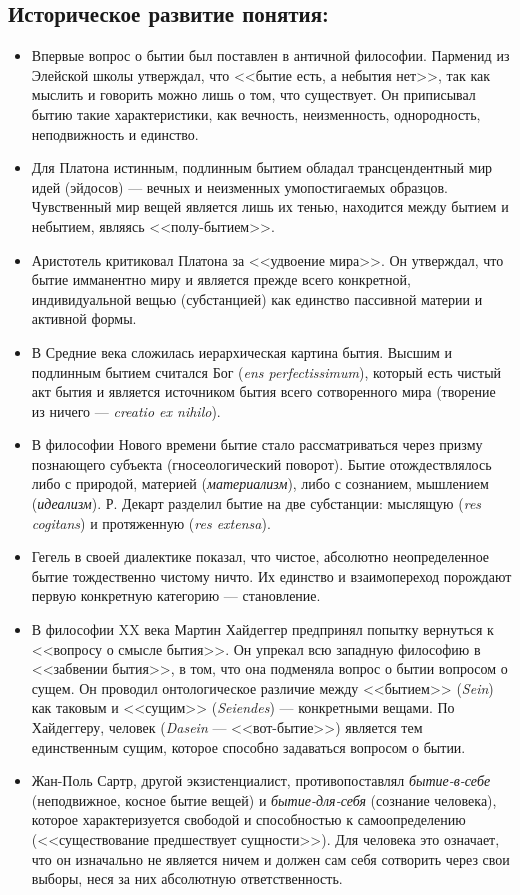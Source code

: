 \documentclass[12pt,a4paper]{article}
\begin{document}
	\subsection{Историческое развитие понятия:}
	\begin{itemize}
		\item Впервые вопрос о бытии был поставлен в античной философии. Парменид из Элейской школы утверждал, что <<бытие есть, а небытия нет>>, так как мыслить и говорить можно лишь о том, что существует. Он приписывал бытию такие характеристики, как вечность, неизменность, однородность, неподвижность и единство.
		\item Для Платона истинным, подлинным бытием обладал трансцендентный мир идей (эйдосов) — вечных и неизменных умопостигаемых образцов. Чувственный мир вещей является лишь их тенью, находится между бытием и небытием, являясь <<полу-бытием>>.
		\item Аристотель критиковал Платона за <<удвоение мира>>. Он утверждал, что бытие имманентно миру и является прежде всего конкретной, индивидуальной вещью (субстанцией) как единство пассивной материи и активной формы.
		\item В Средние века сложилась иерархическая картина бытия. Высшим и подлинным бытием считался Бог (\textit{ens perfectissimum}), который есть чистый акт бытия и является источником бытия всего сотворенного мира (творение из ничего — \textit{creatio ex nihilo}).
		\item В философии Нового времени бытие стало рассматриваться через призму познающего субъекта (гносеологический поворот). Бытие отождествлялось либо с природой, материей (\textit{материализм}), либо с сознанием, мышлением (\textit{идеализм}). Р. Декарт разделил бытие на две субстанции: мыслящую (\textit{res cogitans}) и протяженную (\textit{res extensa}).
		\item Гегель в своей диалектике показал, что чистое, абсолютно неопределенное бытие тождественно чистому ничто. Их единство и взаимопереход порождают первую конкретную категорию — становление.
		\item В философии XX века Мартин Хайдеггер предпринял попытку вернуться к <<вопросу о смысле бытия>>. Он упрекал всю западную философию в <<забвении бытия>>, в том, что она подменяла вопрос о бытии вопросом о сущем. Он проводил онтологическое различие между <<бытием>> (\textit{Sein}) как таковым и <<сущим>> (\textit{Seiendes}) — конкретными вещами. По Хайдеггеру, человек (\textit{Dasein} — <<вот-бытие>>) является тем единственным сущим, которое способно задаваться вопросом о бытии.
		\item Жан-Поль Сартр, другой экзистенциалист, противопоставлял \textit{бытие-в-себе} (неподвижное, косное бытие вещей) и \textit{бытие-для-себя} (сознание человека), которое характеризуется свободой и способностью к самоопределению (<<существование предшествует сущности>>). Для человека это означает, что он изначально не является ничем и должен сам себя сотворить через свои выборы, неся за них абсолютную ответственность.
	\end{itemize}
	
\end{document}
